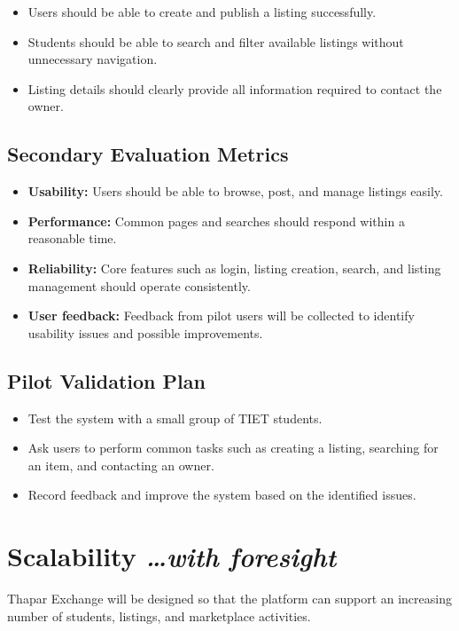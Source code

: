 \documentclass[11pt,a4paper]{article}
\newcommand{\BvrHint}[1]{%
  {\normalfont\normalsize\itshape\hfill #1}}
\begin{document}
\begin{itemize}[leftmargin=0.7cm]
    \item Users should be able to create and publish a listing successfully.
    \item Students should be able to search and filter available listings without unnecessary navigation.
    \item Listing details should clearly provide all information required to contact the owner.
\end{itemize}

\subsection{Secondary Evaluation Metrics}
\begin{itemize}[leftmargin=0.7cm]
    \item \textbf{Usability:} Users should be able to browse, post, and manage listings easily.
    \item \textbf{Performance:} Common pages and searches should respond within a reasonable time.
    \item \textbf{Reliability:} Core features such as login, listing creation, search, and listing management should operate consistently.
    \item \textbf{User feedback:} Feedback from pilot users will be collected to identify usability issues and possible improvements.
\end{itemize}
\subsection{Pilot Validation Plan}
\begin{itemize}[leftmargin=0.7cm]
    \item Test the system with a small group of TIET students.
    \item Ask users to perform common tasks such as creating a listing, searching for an item, and contacting an owner.
    \item Record feedback and improve the system based on the identified issues.
\end{itemize}
\section{Scalability %
\BvrHint{\ldots with foresight}}

Thapar Exchange will be designed so that the platform can support an increasing number of students, listings, and marketplace activities.
\end{document}
